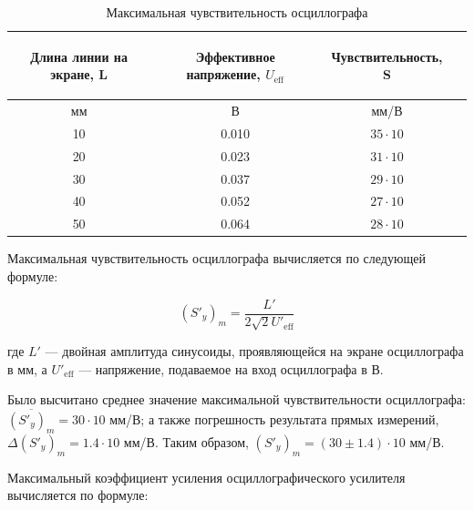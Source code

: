 \begin{center}
\begin{table}[H]
\centering
\caption{Максимальная чувствительность осциллографа}
\label{tabl:3}
\renewcommand{\arraystretch}{1.15}
\begin{tabular}{|c|c|c|c|}
\hline
\begin{minipage}{5cm}
\begin{center}
    Длина линии на экране, L
\end{center}
\end{minipage} &
\begin{minipage}{5cm}
\begin{center}
    Эффективное напряжение, $U_{\text{eff}}$
\end{center}
\end{minipage} &
\begin{minipage}{5cm}
\begin{center}
    Чувствительность, S
\end{center}
\end{minipage}\\
\hline
мм&В&мм/В\\
\hline
10  &  0.010  &  $35\cdot10$ \\
20  &  0.023  &  $31\cdot10$ \\
30  &  0.037  &  $29\cdot10$ \\
40  &  0.052  &  $27\cdot10$ \\
50  &  0.064  &  $28\cdot10$ \\
\hline
\end{tabular}
\end{table}
\end{center}

Максимальная чувствительность осциллографа вычисляется по следующей формуле:

\begin{equation}
\label{eq:6}
   (S'_y)_m=\frac{L'}{2\sqrt{2}U'_\text{{eff}}}
\end{equation}

где $L'$ — двойная амплитуда синусоиды, проявляющейся на экране осциллографа в мм, а $U'_\text{{eff}}$ — напряжение, подаваемое на вход осциллографа в В.

Было высчитано среднее значение максимальной чувствительности осциллографа: $\overline{(S'_y)_m} = 30 \cdot 10$ мм/В; а также погрешность результата прямых измерений, $\Delta (S'_y)_m = 1.4 \cdot 10$ мм/В. Таким образом, $(S'_y)_m = (30 \pm 1.4) \cdot 10$ мм/В.

Максимальный коэффициент усиления осциллографического усилителя вычисляется по формуле:

